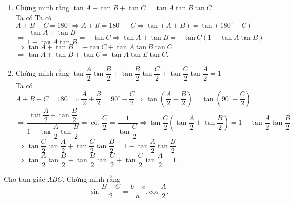 \begin{bt}
{\begin{enumerate}
			$=1-\cos C\cdot 2\cos A\cos (-B)=1-2\cos A\cos B\cos C$
			\item Chứng minh rằng $\tan A+\tan B+\tan C=\tan A\tan B\tan C$\\
			Ta có Ta có $A+B+C=180^\circ \Rightarrow A+B=180^\circ-C \Rightarrow \tan (A+B)=\tan \left(180^\circ-C\right)$ \\
			$ \Rightarrow \dfrac{\tan A+\tan B}{1-\tan A\tan B}=-\tan C \Rightarrow \tan A+\tan B=-\tan C\left(1-\tan A\tan B\right)$ \\
			$ \Rightarrow \tan A+\tan B=-\tan C+\tan A\tan B\tan C$ \\
			$ \Rightarrow \tan A+\tan B+\tan C=\tan A\tan B\tan C$.
			\item Chứng minh rằng $\tan \dfrac{A}{2}\tan \dfrac{B}{2}+\tan \dfrac{B}{2}\tan \dfrac{C}{2}+\tan \dfrac{C}{2}\tan \dfrac{A}{2}=1$\\
			Ta có $A+B+C=180^\circ \Rightarrow \dfrac{A}{2}+\dfrac{B}{2}=90^\circ-\dfrac{C}{2} \Rightarrow \tan \left(\dfrac{A}{2}+\dfrac{B}{2}\right)=\tan \left(90^\circ-\dfrac{C}{2}\right)$ \\
			$ \Rightarrow \dfrac{\tan \dfrac{A}{2}+\tan \dfrac{B}{2}}{1-\tan \dfrac{A}{2} \tan \dfrac{B}{2}}=\cot \dfrac{C}{2}=\dfrac{1}{\tan \dfrac{C}{2}} \Rightarrow \tan \dfrac{C}{2}\left(\tan \dfrac{A}{2}+\tan \dfrac{B}{2}\right)=1-\tan \dfrac{A}{2} \tan \dfrac{B}{2}$ \\
			$ \Rightarrow \tan \dfrac{C}{2} \tan \dfrac{A}{2}+\tan \dfrac{C}{2} \tan \dfrac{B}{2}=1-\tan \dfrac{A}{2} \tan \dfrac{B}{2}$ \\
			$ \Rightarrow \tan \dfrac{A}{2} \tan \dfrac{B}{2}+\tan \dfrac{B}{2} \tan \dfrac{C}{2}+\tan \dfrac{C}{2} \tan \dfrac{A}{2}=1$.
		\end{enumerate}
	}
\end{bt}

\begin{bt}%
	Cho tam giác $ABC$. Chứng minh rằng
	$$\sin \frac{{B - C}}{2} = \frac{{b - c}}{a}.\cos \frac{A}{2}.$$
\end{bt}

